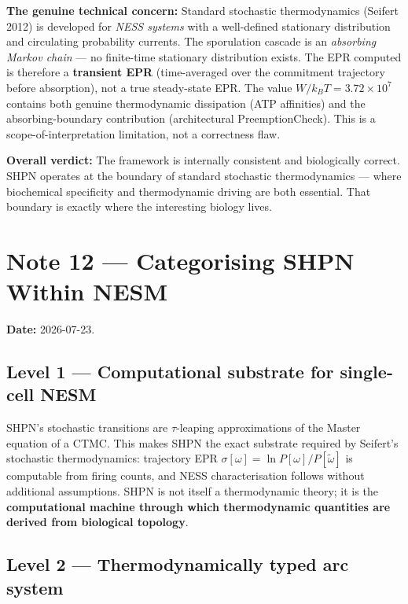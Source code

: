\documentclass[11pt,a4paper]{article}
\begin{document}
\textbf{The genuine technical concern:}
Standard stochastic thermodynamics (Seifert 2012) is developed for
\emph{NESS systems} with a well-defined stationary distribution and
circulating probability currents.
The sporulation cascade is an \emph{absorbing Markov chain} --- no
finite-time stationary distribution exists.
The EPR computed is therefore a \textbf{transient EPR} (time-averaged
over the commitment trajectory before absorption), not a true
steady-state EPR.
The value $W/k_BT = 3.72\times10^7$ contains both genuine thermodynamic
dissipation (ATP affinities) and the absorbing-boundary contribution
(architectural PreemptionCheck).
This is a scope-of-interpretation limitation, not a correctness flaw.

\textbf{Overall verdict:}
The framework is internally consistent and biologically correct.
SHPN operates at the boundary of standard stochastic thermodynamics ---
where biochemical specificity and thermodynamic driving are both essential.
That boundary is exactly where the interesting biology lives.

\section*{Note 12 — Categorising SHPN Within NESM}

\textbf{Date:} 2026-07-23.

\subsection*{Level 1 — Computational substrate for single-cell NESM}

SHPN's stochastic transitions are $\tau$-leaping approximations of the
Master equation of a CTMC.
This makes SHPN the exact substrate required by Seifert's stochastic
thermodynamics: trajectory EPR
$\sigma[\omega] = \ln P[\omega]/P[\tilde\omega]$ is computable from firing
counts, and NESS characterisation follows without additional assumptions.
SHPN is not itself a thermodynamic theory; it is the \textbf{computational
machine through which thermodynamic quantities are derived from biological
topology}.

\subsection*{Level 2 — Thermodynamically typed arc system}
\end{document}
